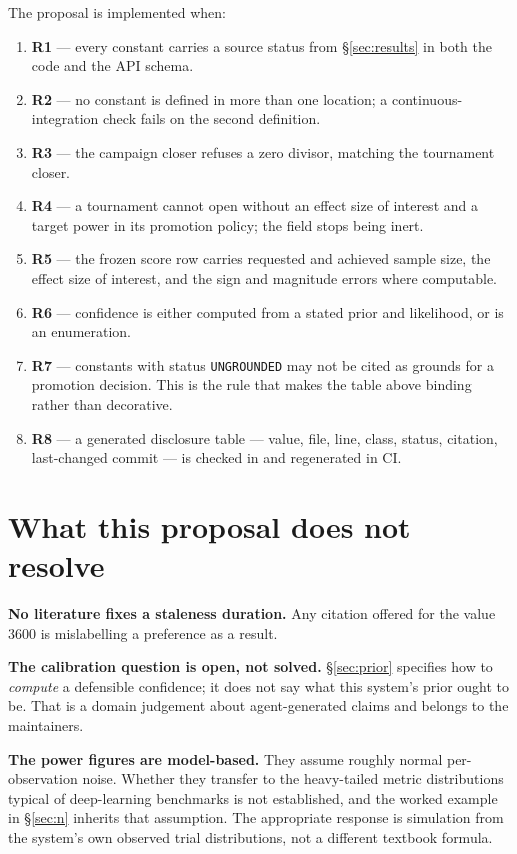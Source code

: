 \documentclass[11pt,letterpaper]{article}
\newcommand{\code}[1]{\texttt{#1}}
\begin{document}
The proposal is implemented when:

\begin{enumerate}
\item \textbf{R1} --- every constant carries a source status from
\S\ref{sec:results} in both the code and the API schema.
\item \textbf{R2} --- no constant is defined in more than one location; a
continuous-integration check fails on the second definition.
\item \textbf{R3} --- the campaign closer refuses a zero divisor, matching the
tournament closer.
\item \textbf{R4} --- a tournament cannot open without an effect size of interest
and a target power in its promotion policy; the field stops being inert.
\item \textbf{R5} --- the frozen score row carries requested and achieved
sample size, the effect size of interest, and the sign and magnitude errors
where computable.
\item \textbf{R6} --- confidence is either computed from a stated prior and
likelihood, or is an enumeration.
\item \textbf{R7} --- constants with status \code{UNGROUNDED} may not be cited as
grounds for a promotion decision. This is the rule that makes the table above
binding rather than decorative.
\item \textbf{R8} --- a generated disclosure table --- value, file, line, class,
status, citation, last-changed commit --- is checked in and regenerated in CI.
\end{enumerate}

\section{What this proposal does not resolve}

\textbf{No literature fixes a staleness duration.} Any citation offered for the
value $3600$ is mislabelling a preference as a result.

\textbf{The calibration question is open, not solved.} \S\ref{sec:prior} specifies
how to \emph{compute} a defensible confidence; it does not say what this system's
prior ought to be. That is a domain judgement about agent-generated claims and
belongs to the maintainers.

\textbf{The power figures are model-based.} They assume roughly normal
per-observation noise. Whether they transfer to the heavy-tailed metric
distributions typical of deep-learning benchmarks is not established, and the
worked example in \S\ref{sec:n} inherits that assumption. The appropriate response
is simulation from the system's own observed trial distributions, not a different
textbook formula.
\end{document}
